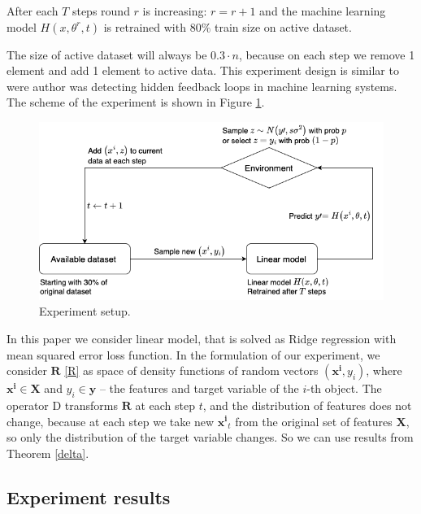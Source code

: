 \documentclass{article}
\begin{document}
        After each $T$ steps round $r$ is increasing: $r = r+1$ and the machine learning model $H(x, \theta^r, t)$ is retrained with $80\%$ train size on active dataset. 

        The size of active dataset will always be $0.3 \cdot n$, because on each step we remove 1 element and add 1 element to active data. This experiment design is similar to \cite{khritankov2021hidden} were author was detecting hidden feedback loops in machine learning systems. The scheme of the experiment is shown in Figure \ref{ex_set}.

        \begin{figure}[h!]
            \centering
            \includegraphics[scale = 0.5]{pictures/Experiment_setup.png}
            \caption{Experiment setup.}
            \label{ex_set}
        \end{figure}

        In this paper we consider linear model, that is solved as Ridge regression with mean squared error loss function. In the formulation of our experiment, we consider $\mathbf{R}$ \eqref{R} as space of density functions of random vectors $(\mathbf{x^i}, y_i)$, where $\mathbf{x^i} \in \textbf{X}$ and $y_i \in \textbf{y}$ -- the features and target variable of the $i$-th object. The operator $\text{D}$ transforms $\mathbf{R}$ at each step $t$, and the distribution of features does not change, because at each step we take new $\mathbf{x^i}_t$ from the original set of features $\textbf{X}$, so only the distribution of the target variable changes. So we can use results from Theorem \ref{delta}. 

\newpage

    \subsection{Experiment results} \label{res}
\end{document}
